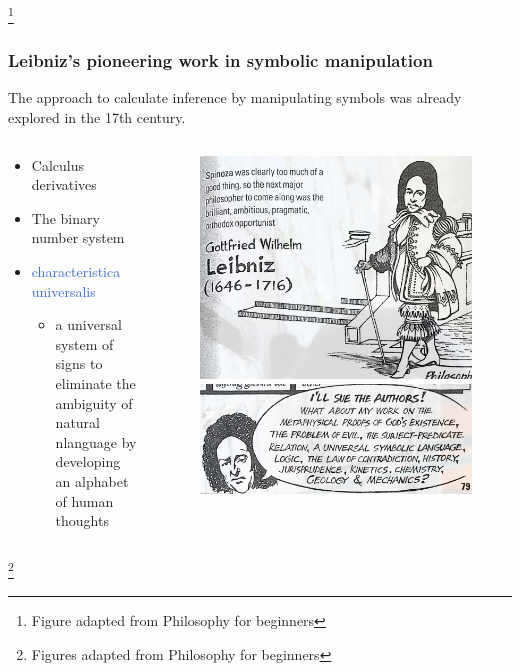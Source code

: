 \documentclass[unicode, 14pt, aspectratio=169]{beamer}
\newcommand\blfootnote[1]{%
  \begingroup
  \renewcommand\thefootnote{}\footnote{#1}%
  \addtocounter{footnote}{-1}%
  \endgroup
}
\begin{document}
\begin{frame}
\begin{columns}
\begin{column}{0.2\textwidth}
\begin{figure}
      \end{figure}       
    \end{column} 
  \end{columns}
  \blfootnote{Figure adapted from Philosophy for beginners\supercite{philosophy-for-begginers}}
\end{frame}

\begin{frame}
  \frametitle{Leibniz's pioneering work in symbolic manipulation}
  {\large The approach to calculate inference by manipulating symbols was already explored in the 17th century.}  
  \begin{columns}
    \begin{column}{0.55\textwidth}
      {\setlength{\leftmarginii}{16pt}
      \begin{itemize}
        \item Calculus derivatives
        \item The binary number system
        \item \textcolor{highlight}{characteristica universalis}
          \begin{itemize}
          \item a universal system of signs to eliminate the ambiguity of natural nlanguage by developing an alphabet of human thoughts
          \end{itemize}
        \end{itemize}
      }
    \end{column}    
    \begin{column}{0.4\textwidth}
      \begin{figure}
        \includegraphics[width=0.65\linewidth]{images/leibniz.png}
        \includegraphics[width=0.65\linewidth]{images/universal.png}
      \end{figure}
    \end{column} 
  \end{columns}
  \blfootnote{Figures adapted from Philosophy for beginners\supercite{philosophy-for-begginers}}  
\end{frame}
\end{document}
